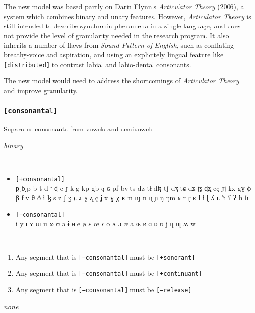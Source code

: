 \documentclass[10pt,letterpaper]{article}
\begin{document}
The new model was based partly on Darin Flynn's \emph{Articulator Theory} (2006), a system which combines binary and unary features. However, \emph{Articulator Theory} is still intended to describe synchronic phenomena in a single language, and does not provide the level of granularity needed in the research program. It also inherits a number of flaws from \emph{Sound Pattern of English}, such as conflating breathy-voice and aspiration, and using an explicitely lingual feature like \texttt{[distributed]} to contrast labial and labio-dental consonants.

The new model would need to address the shortcomings of \emph{Articulator Theory} and improve granularity.

\subsubsection{\texttt{[consonantal]}}
\label{ssub:feature_consonantal}

\begin{samepage}
\begin{description}
\itemsep1pt \parskip0pt  
\item[Descritpion] Separates consonants from vowels and semivowels
\item[Type] \emph{binary}
\item[Examples]\
  \begin{itemize}
    \item \texttt{[+consonantal]}\\
    p̪ b̪ p b t d ʈ ɖ c ɟ k g kp gb q ɢ pf bv ts dz tɬ dɮ tʃ dʒ tɕ dʑ ʈʂ ɖʐ cç ɟʝ kx gɣ ɸ β f v θ ð ɬ ɮ s z ʃ ʒ ɕ ʑ ʂ ʐ ç ʝ x ɣ χ ʁ m ɱ n ɳ ɲ ŋ ŋm ɴ r ɽ ʀ l ɫ ɭ ʎ ʟ ħ ʕ ʔ h ɦ 
    \item \texttt{[−consonantal]}\\
    i y ɪ ʏ ɯ u ɷ ʊ ə ɨ ʉ e ø ɛ œ ɤ o ʌ ɔ æ a ɶ ɐ ɑ ɒ ʋ j ɥ ɰ ʍ w 
  \end{itemize}
\item[Constraints]\
  \begin{enumerate}
  \itemsep1pt \parskip0pt  
    \item Any segment that is \texttt{[−consonantal]} must be \texttt{[+sonorant]}
    \item Any segment that is \texttt{[−consonantal]} must be \texttt{[+continuant]}
    \item Any segment that is \texttt{[−consonantal]} must be \texttt{[−release]}
  \end{enumerate}
\item[Resctrictions] \emph{none}
\end{description}
\end{samepage}
\end{document}
